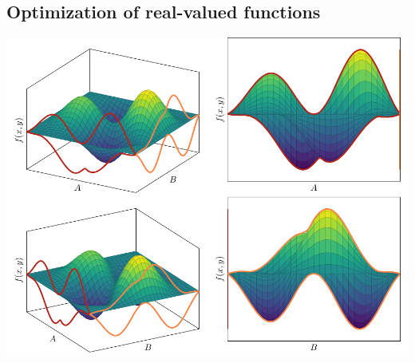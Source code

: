 \documentclass[12pt]{article}
\theoremstyle{definition}
\theoremstyle{remark}
\begin{document}
\subsection{Optimization of real-valued functions}
\begin{center}
    \includegraphics[]{figures/min_max_multivariate_function/figure.pdf}
\end{center}
\end{document}
